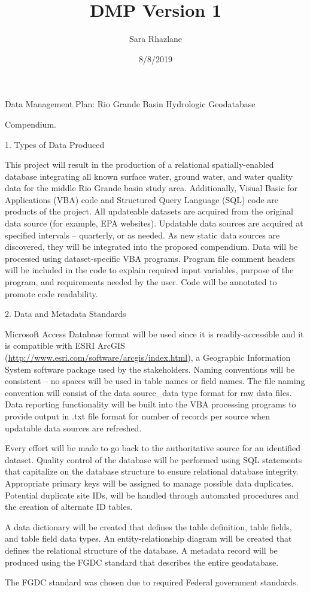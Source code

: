 \documentclass[ignorenonframetext,]{beamer}
\title{DMP Version 1}
\author{Sara Rhazlane}
\date{8/8/2019}
\begin{document}
\frame{\titlepage}

\begin{frame}{Data Management Plan: Rio Grande Basin Hydrologic
Geodatabase}

Compendium.

\end{frame}

\begin{frame}{1. Types of Data Produced}

This project will result in the production of a relational
spatially-enabled database integrating all known surface water, ground
water, and water quality data for the middle Rio Grande basin study
area. Additionally, Visual Basic for Applications (VBA) code and
Structured Query Language (SQL) code are products of the project. All
updateable datasets are acquired from the original data source (for
example, EPA websites). Updatable data sources are acquired at specified
intervals -- quarterly, or as needed. As new static data sources are
discovered, they will be integrated into the proposed compendium. Data
will be processed using dataset‐specific VBA programs. Program file
comment headers will be included in the code to explain required input
variables, purpose of the program, and requirements needed by the user.
Code will be annotated to promote code readability.

\end{frame}

\begin{frame}{2. Data and Metadata Standards}

Microsoft Access Database format will be used since it is
readily-accessible and it is compatible with ESRI ArcGIS
(\url{http://www.esri.com/software/arcgis/index.html}), a Geographic
Information System software package used by the stakeholders. Naming
conventions will be consistent -- no spaces will be used in table names
or field names. The file naming convention will consist of the data
source\_data type format for raw data files. Data reporting
functionality will be built into the VBA processing programs to provide
output in .txt file format for number of records per source when
updatable data sources are refreshed.

Every effort will be made to go back to the authoritative source for an
identified dataset. Quality control of the database will be performed
using SQL statements that capitalize on the database structure to ensure
relational database integrity. Appropriate primary keys will be assigned
to manage possible data duplicates. Potential duplicate site IDs, will
be handled through automated procedures and the creation of alternate ID
tables.

A data dictionary will be created that defines the table definition,
table fields, and table field data types. An entity-relationship diagram
will be created that defines the relational structure of the database. A
metadata record will be produced using the FGDC standard that describes
the entire geodatabase.

The FGDC standard was chosen due to required Federal government
standards.

\end{frame}
\end{document}
